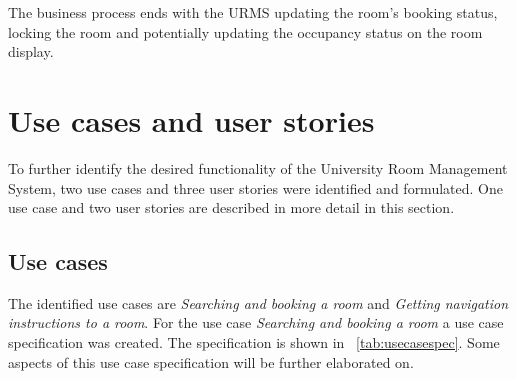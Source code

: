 \documentclass[conference,onecolumn]{IEEEtran}
\begin{document}
The business process ends with the URMS updating the room's booking status, locking the room and potentially updating the occupancy status on the room display.

\section{Use cases and user stories}

To further identify the desired functionality of the University Room Management System, two use cases and three user stories were identified and formulated.
One use case and two user stories are described in more detail in this section.

\subsection{Use cases}

The identified use cases are \emph{Searching and booking a room} and \emph{Getting navigation instructions to a room}.
For the use case \emph{Searching and booking a room} a use case specification was created. The specification is shown in \tablename~\ref{tab:usecasespec}. Some aspects of this use case specification will be further elaborated on.
\end{document}
